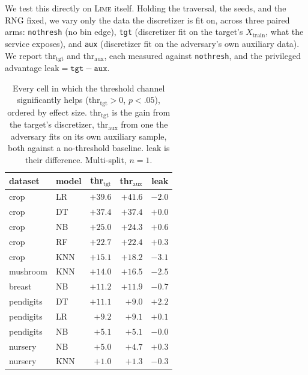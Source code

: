 \documentclass[sigconf,anonymous,review]{acmart}
\begin{document}
We test this directly on \textsc{Lime} itself. Holding the traversal, the seeds, and the RNG fixed, we
vary only the data the discretizer is fit on, across three paired arms: \texttt{nothresh} (no bin
edge), \texttt{tgt} (discretizer fit on the target's $X_{\text{train}}$, what the service exposes),
and \texttt{aux} (discretizer fit on the adversary's own auxiliary data). We report
$\text{thr}_{\text{tgt}}$ and $\text{thr}_{\text{aux}}$, each measured against \texttt{nothresh}, and
the privileged advantage $\text{leak}=\texttt{tgt}-\texttt{aux}$.

\begin{table}[t]
\centering
\caption{Every cell in which the threshold channel significantly helps ($\text{thr}_{\text{tgt}}>0$,
$p{<}.05$), ordered by effect size. $\text{thr}_{\text{tgt}}$ is the gain from the target's
discretizer, $\text{thr}_{\text{aux}}$ from one the adversary fits on its own auxiliary sample, both
against a no-threshold baseline. $\text{leak}$ is their difference. Multi-split, $n{=}1$.}
\label{tab:auxdisc}
\begin{tabular}{llrrr}
\toprule
dataset & model & thr$_{\text{tgt}}$ & thr$_{\text{aux}}$ & leak \\
\midrule
crop      & LR  & $+39.6$ & $+41.6$ & $-2.0$ \\
crop      & DT  & $+37.4$ & $+37.4$ & $+0.0$ \\
crop      & NB  & $+25.0$ & $+24.3$ & $+0.6$ \\
crop      & RF  & $+22.7$ & $+22.4$ & $+0.3$ \\
crop      & KNN & $+15.1$ & $+18.2$ & $-3.1$ \\
mushroom  & KNN & $+14.0$ & $+16.5$ & $-2.5$ \\
breast    & NB  & $+11.2$ & $+11.9$ & $-0.7$ \\
pendigits & DT  & $+11.1$ & $+9.0$  & $+2.2$ \\
pendigits & LR  & $+9.2$  & $+9.1$  & $+0.1$ \\
pendigits & NB  & $+5.1$  & $+5.1$  & $-0.0$ \\
nursery   & NB  & $+5.0$  & $+4.7$  & $+0.3$ \\
nursery   & KNN & $+1.0$  & $+1.3$  & $-0.3$ \\
\bottomrule
\end{tabular}
\end{table}
\end{document}
